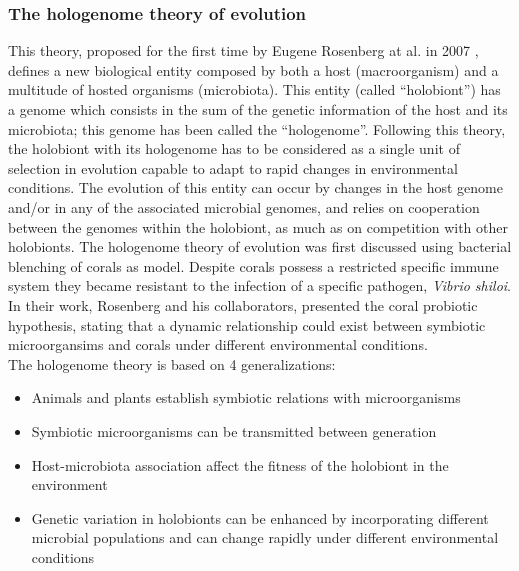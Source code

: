 \subsubsection{The hologenome theory of evolution}
This theory, proposed for the first time by Eugene Rosenberg at al. in 2007 \cite{rosenberg2007role}, defines a new biological entity composed by both a host (macroorganism) and a multitude of hosted organisms (microbiota). This entity (called ``holobiont'') has a genome which consists in the sum of the genetic information of the host and its microbiota; this genome has been called the ``hologenome''. Following this theory, the holobiont with its hologenome has to be considered as a single unit of selection in evolution capable to adapt to rapid changes in environmental conditions. The evolution of this entity can occur by changes in the host genome and/or in any of the associated microbial genomes, and relies on cooperation between the genomes within the holobiont, as much as on competition with other holobionts. The hologenome theory of evolution was first discussed using bacterial blenching of corals as model. Despite corals possess a restricted specific immune system they became resistant to the infection of a specific pathogen, \textit{Vibrio shiloi}. In their work, Rosenberg and his collaborators, presented the coral probiotic hypothesis, stating that a dynamic relationship could exist between symbiotic microorgansims and corals under different environmental conditions.\\
The hologenome theory is based on 4 generalizations:
\vspace{-3mm}
\begin{itemize}[nosep]
\item Animals and plants establish symbiotic relations with microorganisms
\item Symbiotic microorganisms can be transmitted between generation
\item Host-microbiota association affect the fitness of the holobiont in the environment
\item Genetic variation in holobionts can be enhanced by incorporating different microbial populations and can change rapidly under different environmental conditions
\end{itemize}


